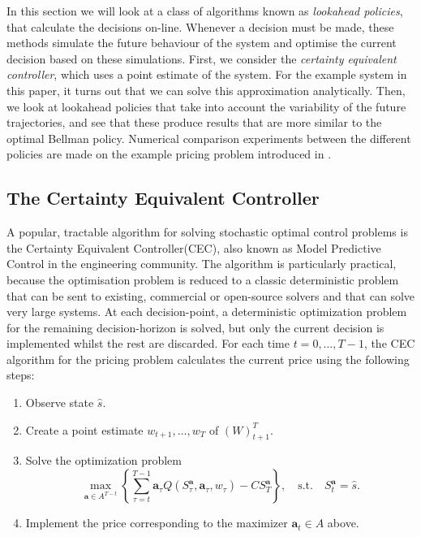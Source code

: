 \documentclass[main.tex]{subfiles}
\begin{document}
In this section we will look at a class of algorithms known as
\emph{lookahead policies}, that calculate the decisions on-line.
Whenever a decision must be made, these methods simulate the future
behaviour of the system and optimise the current decision based on
these simulations. First, we consider the \emph{certainty equivalent
  controller}, which uses a point estimate of the system. For the
example system in this paper, it turns out that we can solve
this approximation analytically.
Then, we look at lookahead policies that take into account the
variability of the future trajectories, and see that these produce
results that are more similar to the optimal Bellman policy.
Numerical comparison experiments between the different policies are
made on the example pricing problem introduced in .

\subsection{The Certainty Equivalent Controller}
A popular, tractable algorithm for solving stochastic optimal control
problems is the Certainty Equivalent Controller(CEC), also known as Model
Predictive Control in the engineering community.
The algorithm is particularly practical, because the optimisation
problem is reduced to a classic deterministic problem that can
be sent to existing, commercial or open-source solvers and that can
solve very large systems.
At each decision-point, a deterministic optimization problem for the
remaining decision-horizon is solved, but only the current decision is
implemented whilst the rest are discarded.
For each time $t=0,\dots,T-1$, the CEC algorithm for the pricing
problem calculates the current price using the following steps:
\begin{enumerate}
\item Observe state $\hat s$.
\item Create a point estimate $w_{t+1},\dots,w_T$ of ${(W)}_{t+1}^T$.
\item Solve the optimization problem
  \begin{equation}
    \max_{\mathbf a\in A^{T-t}}\left\{\sum_{\tau=t}^{T-1}\mathbf
      a_\tau Q(S_\tau^{\mathbf a},\mathbf
      a_\tau,w_{\tau})-CS_T^{\mathbf a}\right\},
    \quad \text{s.t.}\quad S_t^{\mathbf a}=\hat s.
  \end{equation}
\item Implement the price corresponding to the maximizer $\mathbf
  a_t\in A$ above.
\end{enumerate}
\end{document}
